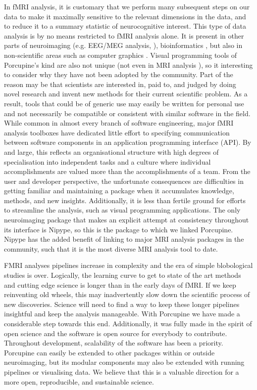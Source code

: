 In fMRI analysis, it is customary that we perform many subsequent steps on our data to make it maximally sensitive to the relevant dimensions in the data, and to reduce it to a summary statistic of neurocognitive interest. This type of data analysis is by no means restricted to fMRI analysis alone. It is present in other parts of neuroimaging (e.g. EEG/MEG analysis, \cite{Oostenveld2011}), bioinformatics \cite{Wolstencroft2013}, but also in non-scientific areas such as computer graphics \cite{Blender}. Visual programming tools of Porcupine's kind are also not unique (not even in MRI analysis \cite{Lucas2010}), so it interesting to consider why they have not been adopted by the community. Part of the reason may be that scientists are interested in, paid to, and judged by doing novel research and invent new methods for their current scientific problem. As a result, tools that could be of generic use may easily be written for personal use and not necessarily be compatible or consistent with similar software in the field. While common in almost every branch of software engineering, major fMRI analysis toolboxes have dedicated little effort to specifying communication between software components in an application programming interface (API). By and large, this reflects an organisational structure with high degrees of specialisation into independent tasks and a culture where individual accomplishments are valued more than the accomplishments of a team. From the user and developer perspective, the unfortunate consequences are difficulties in getting familiar and maintaining a package when it accumulates knowledge, methods, and new insights. Additionally, it is less than fertile ground for efforts to streamline the analysis, such as visual programming applications. The only neuroimaging package that makes an explicit attempt at consistency throughout its interface is Nipype, so this is the package to which we linked Porcupine. Nipype has the added benefit of linking to major MRI analysis packages in the community, such that it is the most diverse MRI analysis tool to date. 

FMRI analyses pipelines increase in complexity and the era of simple blobological studies is over. Logically, the learning curve to get to state of the art methods and cutting edge science is longer than in the early days of fMRI. If we keep reinventing old wheels, this may inadvertently slow down the scientific process of new discoveries. Science will need to find a way to keep these longer pipelines insightful and keep the analysis manageable. With Porcupine we have made a considerable step towards this end. Additionally, it was fully made in the spirit of open science and the software is open source for everybody to contribute. Throughout development, scalability of the software has been a priority. Porcupine can easily be extended to other packages within or outside neuroimaging, but its modular components may also be extended with running pipelines or visualising data. We believe that this is a valuable direction for a more open, reproducible, and sustainable science.







